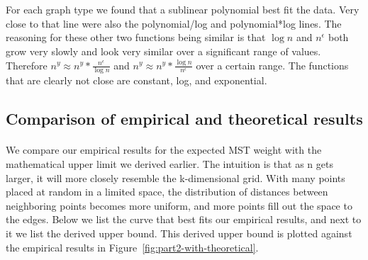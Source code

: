 \begin{figure*}[htb!]
\centering
\mbox{
\quad
{}
}
\mbox{
\quad
{}
}
\label{fig:part2-fit}
\end{figure*}

\paragraph{}
For each graph type we found that a sublinear polynomial best fit
the data. Very close to that line were also the polynomial/log and
polynomial*log lines. The reasoning for these other two functions being
similar is that $\log n$ and $n^\epsilon$ both grow very slowly and look
very similar over a significant range of values. Therefore $n^y \approx
n^y * \frac{n^\epsilon}{\log n}$ and $n^y \approx n^y * \frac{\log
  n}{n^\epsilon}$ over a certain range. The functions that are clearly not
close are constant, log, and exponential.


\subsection{Comparison of empirical and theoretical results}
\paragraph{}
We compare our empirical results for the expected MST weight with the
mathematical upper limit we derived earlier. The intuition is that as n
gets larger, it will more closely resemble the k-dimensional grid. With
many points placed at random in a limited space, the distribution of
distances between neighboring points becomes more uniform, and more points
fill out the space to the edges. Below we
list the curve that best fits our empirical results, and next to it we
list the derived upper bound.  This derived upper bound is plotted against the
empirical results in Figure~\ref{fig:part2-with-theoretical}.


